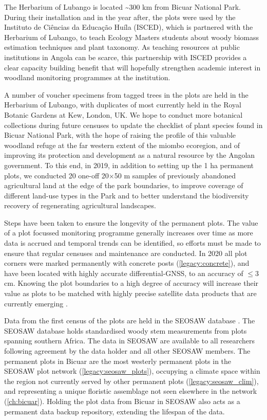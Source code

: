\begin{refsection}
The Herbarium of Lubango is located \textasciitilde{}300 km from Bicuar National Park. During their installation and in the year after, the plots were used by the Instituto de Ci\^{e}ncias da Educa\c{c}\~{a}o Hu\'{i}la (ISCED), which is partnered with the Herbarium of Lubango, to teach Ecology Masters students about woody biomass estimation techniques and plant taxonomy. As teaching resources at public institutions in Angola can be scarce, this partnership with ISCED provides a clear capacity building benefit that will hopefully strengthen academic interest in woodland monitoring programmes at the institution.

A number of voucher specimens from tagged trees in the plots are held in the Herbarium of Lubango, with duplicates of most currently held in the Royal Botanic Gardens at Kew, London, UK. We hope to conduct more botanical collections during future censuses to update the checklist of plant species found in Bicuar National Park, with the hope of raising the profile of this valuable woodland refuge at the far western extent of the miombo ecoregion, and of improving its protection and development as a natural resource by the Angolan government. To this end, in 2019, in addition to setting up the 1 ha permanent plots, we conducted 20 one-off 20$\times$50 m samples of previously abandoned agricultural land at the edge of the park boundaries, to improve coverage of different land-use types in the Park and to better understand the biodiversity recovery of regenerating agricultural landscapes.

Steps have been taken to ensure the longevity of the permanent plots. The value of a plot focussed monitoring programme generally increases over time as more data is accrued and temporal trends can be identified, so efforts must be made to ensure that regular censuses and maintenance are conducted. In 2020 all plot corners were marked permanently with concrete posts (\autoref{legacy:concrete}), and have been located with highly accurate differential-GNSS, to an accuracy of $\le$3 cm. Knowing the plot boundaries to a high degree of accuracy will increase their value as plots to be matched with highly precise satellite data products that are currently emerging \citep{Exbrayat2019, GeorgeChacon2019, Wagner2018}. 

Data from the first census of the plots are held in the SEOSAW database \citep{Ryan2020}. The SEOSAW database holds standardised woody stem measurements from plots spanning southern Africa. The data in SEOSAW are available to all researchers following agreement by the data holder and all other SEOSAW members. The permanent plots in Bicuar are the most westerly permanent plots in the SEOSAW plot network (\autoref{legacy:seosaw_plots}), occupying a climate space within the region not currently served by other permanent plots (\autoref{legacy:seosaw_clim}), and representing a unique floristic assemblage not seen elsewhere in the network (\autoref{ch:bicuar}). Holding the plot data from Bicuar in SEOSAW also acts as a permanent data backup repository, extending the lifespan of the data.


\end{refsection}
